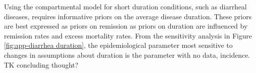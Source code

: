 Using the compartmental model for short duration conditions, 
such as diarrheal diseases, requires informative priors on the 
average disease duration.  These priors are best expressed as 
priors on remission as priors on duration are influenced by remission 
rates and excess mortality rates.  From the sensitivity analysis 
in Figure \ref{fig:app-diarrhea duration}, the epidemiological 
parameter most sensitive to changes in assumptions about duration 
is the parameter with no data, incidence.  TK concluding thought?
